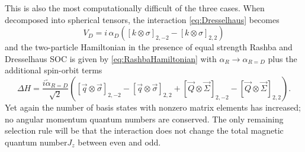\documentclass[%
 preprint,
 amsmath,amssymb,
 aps,
]{revtex4-1}
\begin{document}
This is also the most computationally difficult of the three cases. When decomposed into spherical tensors, the interaction \eqref{eq:Dresselhaus} becomes
\begin{equation}
V_D=i\,\alpha_D \left( \left[ k \otimes \sigma \right]_{2,-2}- \left[ k \otimes \sigma \right]_{2,2}\right)
\end{equation}
and the two-particle Hamiltonian in the presence of equal strength Rashba and Dresselhaus SOC is given by \eqref{eq:RashbaHamiltonian} with $\alpha_R\rightarrow \alpha_{R=D}$ plus the additional spin-orbit terms
\begin{equation}\label{eq:DresselhausHamiltonian}
\Delta H= \frac{i \tilde{\alpha}_{R=D}}{\sqrt{2}}\left(  \left[ \vec{q} \otimes \vec{\sigma} \right]_{2,-2} -  \left[ \vec{q} \otimes \vec{\sigma} \right]_{2,2} +[ \vec{Q} \otimes \vec{\Sigma} ]_{2,-2} -  [ \vec{Q} \otimes \vec{\Sigma} ]_{2,2} \right).
\end{equation} 
Yet again the number of basis states with nonzero matrix elements has increased; no angular momentum quantum numbers are conserved. The only remaining selection rule will be that the interaction does not change the total magnetic quantum number$J_z$ between even and odd. 
\end{document}
